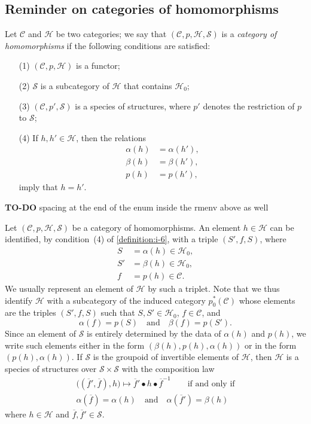 \documentclass[a4paper,fleqn]{article}
\theoremstyle{plain}
\theoremstyle{definition}
\newenvironment{definition}[1]
  {\renewcommand\theinnerdefinition{#1}\innerdefinition}
  {\endinnerdefinition}
\newcommand{\oldpage}[1]{{\marginpar{\footnotesize$\bigg\vert$\,\,\,\,\textit{p.~#1}}}}
\newcommand{\todo}{{\color{purple}\textbf{TO-DO }}}
\newcommand{\textand}{\quad\text{and}\quad}
\newcommand{\CC}{\mathcal{C}}
\newcommand{\HH}{\mathcal{H}}
\renewcommand{\SS}{\mathcal{S}}
\begin{document}
\subsection{Reminder on categories of homomorphisms}
\label{section:i.4}

\begin{definition}{6}
\label{definition:i-6}
  Let $\CC$ and $\HH$ be two categories;
  we say \cite{3a} that $(\CC,p,\HH,\SS)$ is a \emph{category of homomorphisms} if the following conditions are satisfied:
  \begin{enumerate}
    \item[\normalfont(1)]
      $(\CC,p,\HH)$ is a functor;
    \item[\normalfont(2)]
      \oldpage{357}
      $\SS$ is a subcategory of $\HH$ that contains $\HH_0$;
    \item[\normalfont(3)]
      $(\CC,p',\SS)$ is a species of structures, where $p'$ denotes the restriction of $p$ to $\SS$;
    \item[\normalfont(4)]
      If $h,h'\in\HH$, then the relations
      \[
        \begin{aligned}
          \alpha(h)
          &= \alpha(h'),
        \\\beta(h)
          &= \beta(h'),
        \\p(h)
          &= p(h'),
        \end{aligned}
      \]
      imply that $h=h'$.
  \end{enumerate}
\end{definition}

\todo{spacing at the end of the enum inside the rmenv above as well}

Let $(\CC,p,\HH,\SS)$ be a category of homomorphisms.
An element $h\in\HH$ can be identified, by condition~(4) of \cref{definition:i-6}, with a triple $(S',f,S)$, where
\[
  \begin{aligned}
    S
    &= \alpha(h) \in\HH_0,
  \\S'
    &= \beta(h) \in\HH_0,
  \\f
    &= p(h)\in\CC.
  \end{aligned}
\]
We usually represent an element of $\HH$ by such a triplet.
Note that we thus identify $\HH$ with a subcategory of the induced category $p_0^*(\CC)$ whose elements are the triples $(S',f,S)$ such that $S,S'\in\HH_0$, $f\in\CC$, and
\[
  \alpha(f)=p(S)
  \textand
  \beta(f)=p(S').
\]
Since an element of $\SS$ is entirely determined by the data of $\alpha(h)$ and $p(h)$, we write such elements either in the form $(\beta(h),p(h),\alpha(h))$ or in the form $(p(h),\alpha(h))$.
If $\SS$ is the groupoid of invertible elements of $\HH$, then $\HH$ is a species of structures over $\SS\times\SS$ with the composition law
\[
  \begin{gathered}
    \big((\overline{f}',\overline{f}),h\big)
    \longmapsto\overline{f}'\bullet h\bullet\overline{f}^{-1}
    \qquad\text{if and only if}
  \\\alpha(\overline{f})=\alpha(h)
    \textand
    \alpha(\overline{f}')=\beta(h)
  \end{gathered}
\]
where $h\in\HH$ and $\overline{f},\overline{f}'\in\SS$.
\end{document}
